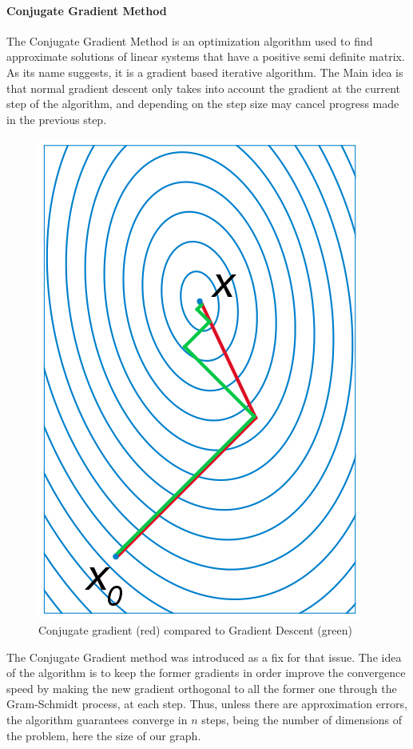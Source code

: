 \documentclass{article}
\theoremstyle{definition}
\begin{document}
\paragraph{Conjugate Gradient Method}
The Conjugate Gradient Method\cite{nesterov_lectures_2018} is an optimization algorithm used to find approximate solutions of linear systems that have a positive semi definite matrix. As its name suggests, it is a gradient based iterative algorithm. The Main idea is that normal gradient descent only takes into account the gradient at the current step of the algorithm, and depending on the step size may cancel progress made in the previous step.
\begin{figure}[!htb]
	\centering
	\includegraphics[height=0.3\textheight]{data/sota/conj_grad.png}
	\caption{Conjugate gradient (red) compared to Gradient Descent (green)}
	\label{fig:conj_grad}
\end{figure} 
The Conjugate Gradient method was introduced as a fix for that issue. The idea of the algorithm is to keep the former gradients in order improve the convergence speed by making the new gradient orthogonal to all the former one through the Gram-Schmidt process, at each step. Thus, unless there are approximation errors, the algorithm guarantees converge in $n$ steps, being the number of dimensions of the problem, here the size of our graph.\\
\end{document}
